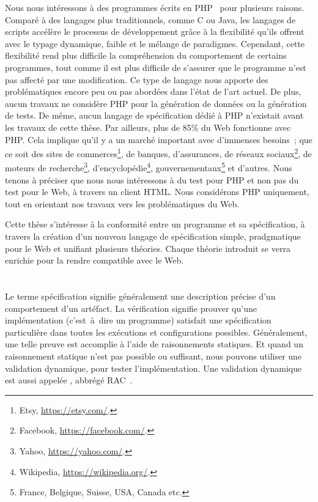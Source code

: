 Nous nous intéressons à des programmes écrits en PHP~ pour plusieurs
raisons. Comparé à des langages plus traditionnels, comme C ou Java, les
langages de scripts accélère le processus de développement grâce à la
flexibilité qu'ils offrent avec le typage dynamique, faible et le mélange de
paradigmes. Cependant, cette flexibilité rend plus difficile la compréhension du
comportement de certains programmes, tout comme il est plus difficile de
s'assurer que le programme n'est pas affecté par une modification. Ce type de
langage nous apporte des problématiques encore peu ou pas abordées dans l'état
de l'art actuel. De plus, aucun travaux ne considère PHP pour la génération de
données ou la génération de tests. De même, aucun langage de spécification dédié
à PHP n'existait avant les travaux de cette thèse. Par ailleurs, plus de 85\% du
Web fonctionne avec PHP. Cela implique qu'il y a un marché important avec
d'immenses besoins~; que ce soit des sites de commerces\footnote{Etsy,
\url{https://etsy.com/}.}, de banques, d'assurances, de réseaux
sociaux\footnote{Facebook, \url{https://facebook.com/}.}, de moteurs de
recherche\footnote{Yahoo, \url{https://yahoo.com/}.},
d'encyclopédie\footnote{Wikipedia, \url{https://wikipedia.org/}.},
gouvernementaux\footnote{France, Belgique, Suisse, USA, Canada etc.} et
d'autres. Nous tenons à préciser que nous nous intéressons à du test pour PHP et
non pas du test pour le Web, à travers un client HTML. Nous considérons PHP
uniquement, tout en orientant nos travaux vers les problématiques du Web.

Cette thèse s'intéresse à la conformité entre un programme et sa spécification,
à travers la création d'un nouveau langage de spécification simple, pradgmatique
pour le Web et unifiant plusieurs théories. Chaque théorie introduit se verra
enrichie pour la rendre compatible avec le Web.

\section{}
\label{section:sota:bisl}

Le terme {\strong spécification} signifie généralement une description précise
d'un comportement d'un artéfact. La {\strong vérification} signifie prouver
qu'une implémentation (c'est~à~dire un programme) satisfait une spécification
particulière dans toutes les exécutions et configurations possibles.
Généralement, une telle preuve est accomplie à l'aide de raisonnements
statiques. Et quand un raisonnement statique n'est pas possible ou suffisant,
nous pouvons utiliser une {\strong validation} dynamique, pour tester
l'implémentation. Une validation dynamique est aussi appelée , abbrégé RAC~.

